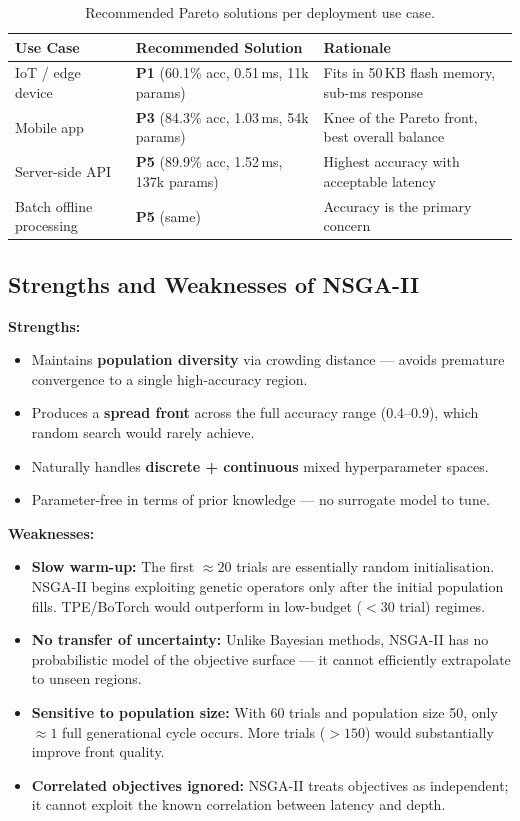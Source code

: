 \documentclass[12pt,a4paper]{article}
\begin{document}
\begin{table}[H]
\centering
\begin{tabular}{L{3cm}L{4.5cm}L{6cm}}
\toprule
\textbf{Use Case} & \textbf{Recommended Solution} & \textbf{Rationale} \\
\midrule
IoT / edge device       & \textbf{P1} (60.1\% acc, 0.51\,ms, 11k params)  & Fits in 50\,KB flash memory, sub-ms response \\
Mobile app              & \textbf{P3} (84.3\% acc, 1.03\,ms, 54k params)  & Knee of the Pareto front, best overall balance \\
Server-side API         & \textbf{P5} (89.9\% acc, 1.52\,ms, 137k params) & Highest accuracy with acceptable latency \\
Batch offline processing& \textbf{P5} (same)                               & Accuracy is the primary concern \\
\bottomrule
\end{tabular}
\caption{Recommended Pareto solutions per deployment use case.}
\end{table}

\subsection{Strengths and Weaknesses of NSGA-II}

\textbf{Strengths:}
\begin{itemize}
    \item Maintains \textbf{population diversity} via crowding distance --- avoids premature convergence to a single high-accuracy region.
    \item Produces a \textbf{spread front} across the full accuracy range (0.4--0.9), which random search would rarely achieve.
    \item Naturally handles \textbf{discrete + continuous} mixed hyperparameter spaces.
    \item Parameter-free in terms of prior knowledge --- no surrogate model to tune.
\end{itemize}

\textbf{Weaknesses:}
\begin{itemize}
    \item \textbf{Slow warm-up:} The first $\approx 20$ trials are essentially random initialisation. NSGA-II begins exploiting genetic operators only after the initial population fills. TPE/BoTorch would outperform in low-budget ($<30$ trial) regimes.
    \item \textbf{No transfer of uncertainty:} Unlike Bayesian methods, NSGA-II has no probabilistic model of the objective surface --- it cannot efficiently extrapolate to unseen regions.
    \item \textbf{Sensitive to population size:} With 60 trials and population size 50, only $\approx 1$ full generational cycle occurs. More trials ($>150$) would substantially improve front quality.
    \item \textbf{Correlated objectives ignored:} NSGA-II treats objectives as independent; it cannot exploit the known correlation between latency and depth.
\end{itemize}
\end{document}
